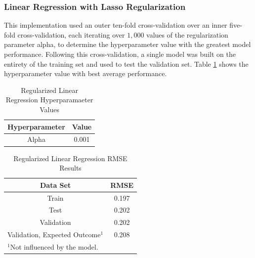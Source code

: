\documentclass[conference]{IEEEtran}
\begin{document}
\subsubsection{Linear Regression with Lasso Regularization}
This implementation used an outer ten-fold cross-validation over an inner five-fold cross-validation, each iterating over $1,000$ values of the regularization parameter alpha, to determine the hyperparameter value with the greatest model performance. Following this cross-validation, a single model was built on the entirety of the training set and used to test the validation set. Table \ref{tab2} shows the hyperparameter value with best average performance. 

\begin{table}[htbp]
\caption{Regularized Linear Regression Hyperparamaeter Values}
\begin{center}
\begin{tabular}{|c||c|}
\hline
\textbf{Hyperparameter} & \textbf{Value} \\
\hline
\hline
Alpha & 0.001 \\
\hline
\end{tabular}
\label{tab2}
\end{center}
\end{table}

\begin{table}[htbp]
\caption{Regularized Linear Regression RMSE Results}
\begin{center}
\begin{tabular}{|c||c|}
\hline
\textbf{Data Set} & \textbf{RMSE} \\
\hline
\hline
Train & 0.197 \\
\hline
Test & 0.202 \\
\hline
Validation & 0.202 \\
\hline
Validation, Expected Outcome$^{\mathrm{1}}$ & 0.208 \\
\hline
\multicolumn{2}{l}{$^{\mathrm{1}}$Not influenced by the model.}
\end{tabular}
\label{tab3}
\end{center}
\end{table}
\end{document}
